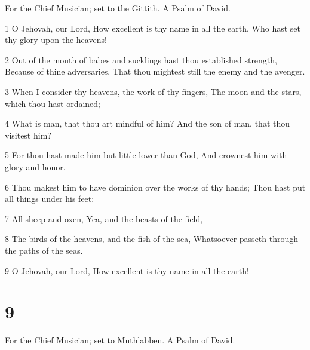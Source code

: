 \par For the Chief Musician; set to the Gittith. A Psalm of David.

\par 1 O Jehovah, our Lord, How excellent is thy name in all the earth, Who hast set thy glory upon the heavens!
\par 2 Out of the mouth of babes and sucklings hast thou established strength, Because of thine adversaries, That thou mightest still the enemy and the avenger.
\par 3 When I consider thy heavens, the work of thy fingers, The moon and the stars, which thou hast ordained;
\par 4 What is man, that thou art mindful of him? And the son of man, that thou visitest him?
\par 5 For thou hast made him but little lower than God, And crownest him with glory and honor.
\par 6 Thou makest him to have dominion over the works of thy hands; Thou hast put all things under his feet:
\par 7 All sheep and oxen, Yea, and the beasts of the field,
\par 8 The birds of the heavens, and the fish of the sea, Whatsoever passeth through the paths of the seas.
\par 9 O Jehovah, our Lord, How excellent is thy name in all the earth!

\chapter{9}

\par For the Chief Musician; set to Muthlabben. A Psalm of David.

